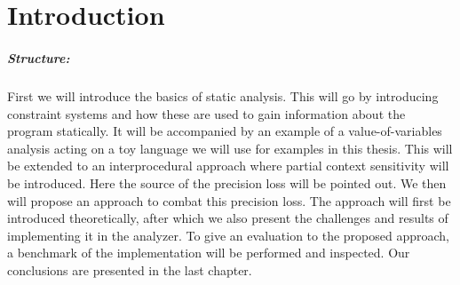 
\chapter{Introduction}\label{chapter:introduction}


\paragraph{Structure:} 
First we will introduce the basics of static analysis. This will go by introducing constraint systems and how these are used to gain information about the program statically. It will be accompanied by an example of a value-of-variables analysis acting on a toy language we will use for examples in this thesis. This will be extended to an interprocedural approach where partial context sensitivity will be introduced. Here the source of the precision loss will be pointed out. We then will propose an approach to combat this precision loss. The approach will first be introduced theoretically, after which we also present the challenges and results of implementing it in the \Gob analyzer. To give an evaluation to the proposed approach, a benchmark of the implementation will be performed and inspected. Our conclusions are presented in the last chapter.

